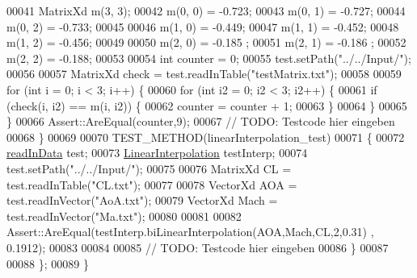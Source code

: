 \begin{DoxyCode}
00041             MatrixXd m(3, 3);
00042             m(0, 0) = -0.723;
00043             m(0, 1) = -0.727;
00044             m(0, 2) = -0.733;
00045 
00046             m(1, 0) = -0.449;
00047             m(1, 1) = -0.452;
00048             m(1, 2) = -0.456;
00049 
00050             m(2, 0) = -0.185 ;
00051             m(2, 1) = -0.186 ;
00052             m(2, 2) = -0.188;
00053 
00054             \textcolor{keywordtype}{int} counter = 0;
00055             test.setPath(\textcolor{stringliteral}{"../../Input/"});
00056 
00057             MatrixXd check = test.readInTable(\textcolor{stringliteral}{"testMatrix.txt"});
00058             
00059             \textcolor{keywordflow}{for} (\textcolor{keywordtype}{int} i = 0; i < 3; i++) \{
00060                 \textcolor{keywordflow}{for} (\textcolor{keywordtype}{int} i2 = 0; i2 < 3; i2++) \{
00061                     \textcolor{keywordflow}{if} (check(i, i2) == m(i, i2)) \{
00062                         counter = counter + 1;
00063                     \}
00064                 \}
00065             \}
00066             Assert::AreEqual(counter,9);
00067             \textcolor{comment}{// TODO: Testcode hier eingeben}
00068         \}
00069 
00070         TEST\_METHOD(linearInterpolation\_test)
00071         \{
00072             \hyperlink{classread_in_data}{readInData} test;
00073             \hyperlink{class_linear_interpolation}{LinearInterpolation} testInterp;
00074             test.setPath(\textcolor{stringliteral}{"../../Input/"});
00075 
00076             MatrixXd CL = test.readInTable(\textcolor{stringliteral}{"CL.txt"});
00077 
00078             VectorXd AOA = test.readInVector(\textcolor{stringliteral}{"AoA.txt"});
00079             VectorXd Mach = test.readInVector(\textcolor{stringliteral}{"Ma.txt"});
00080 
00081 
00082             Assert::AreEqual(testInterp.biLinearInterpolation(AOA,Mach,CL,2,0.31) , 0.1912);
00083             
00084 
00085             \textcolor{comment}{// TODO: Testcode hier eingeben}
00086         \}
00087 
00088     \};
00089 \}
\end{DoxyCode}
